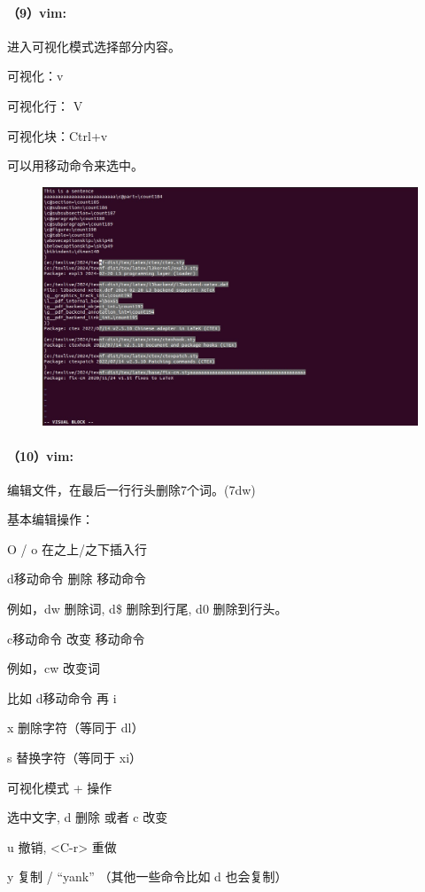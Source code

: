 \documentclass[a4paper, 12pt]{article}
\begin{document}
	\paragraph{（9）vim:}
	进入可视化模式选择部分内容。
	
	可视化：v
	
	可视化行： V
	
	可视化块：Ctrl+v	
	
	可以用移动命令来选中。
	
	\begin{figure}[H]
		\centering
		\includegraphics[width=1\textwidth]{030.jpg}
	\end{figure}
	
	\paragraph{（10）vim:}
	编辑文件，在最后一行行头删除7个词。(7dw)
	
	基本编辑操作：
	
	O / o 在之上/之下插入行
	
	d{移动命令} 删除 {移动命令}
	
	例如，dw 删除词, d\$ 删除到行尾, d0 删除到行头。
	
	c{移动命令} 改变 {移动命令}
	
	例如，cw 改变词
	
	比如 d{移动命令} 再 i
	
	x 删除字符（等同于 dl）
	
	s 替换字符（等同于 xi）
	
	可视化模式 + 操作
	
	选中文字, d 删除 或者 c 改变
	
	u 撤销, <C-r> 重做
	
	y 复制 / “yank” （其他一些命令比如 d 也会复制）
	
\end{document}
